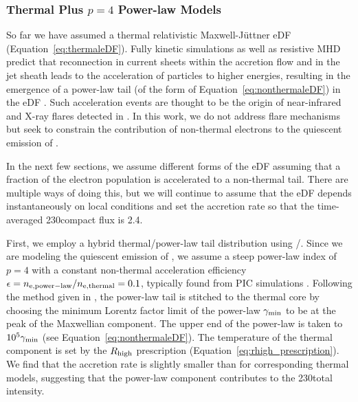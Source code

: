 \subsubsection{Thermal Plus \texorpdfstring{$p = 4$}{p=4} Power-law Models}

So far we have assumed a thermal relativistic Maxwell-J{\"u}ttner eDF (Equation~\ref{eq:thermaleDF}).
Fully kinetic simulations as well as resistive MHD predict that reconnection in current sheets within the accretion flow and in the jet sheath leads to the acceleration of particles to higher energies, resulting in the emergence of a power-law tail (of the form of Equation~\ref{eq:nonthermaleDF}) in the eDF \citep[e.g.,][and references therein]{Sironi2021}.
Such acceleration events are thought to be the origin of near-infrared and X-ray flares detected in \sgra.
In this work, we do not address flare mechanisms but seek to constrain the contribution of non-thermal electrons to the quiescent emission of \sgra.

In the next few sections, we assume different forms of the eDF assuming that a fraction of the electron population is accelerated to a non-thermal tail.
There are multiple ways of doing this, but we will continue to assume that the eDF depends instantaneously on local conditions and set the accretion rate so that the time-averaged 230\GHz compact flux is 2.4\Jy.

First, we employ a hybrid thermal/power-law tail distribution using \hamr/\bhoss.
Since we are modeling the quiescent emission of \sgra, we assume a steep power-law index of $p=4$ with a constant non-thermal acceleration efficiency $\epsilon=n_{\rm e, power-law}/n_{\rm e, thermal}=0.1$, typically found from PIC simulations \citep[e.g.,][]{Sironi2015,Crumley2019}.
Following the method given in \citet{Chatterjee2021}, the power-law tail is stitched to the thermal core by choosing the minimum Lorentz factor limit of the power-law $\gamma_{\rm min}$ to be at the peak of the Maxwellian component.
The upper end of the power-law is taken to $10^5 \gamma_{\rm min}$ (see Equation~\ref{eq:nonthermaleDF}).
The temperature of the thermal component is set by the $R_\mathrm{high}$ prescription (Equation~\ref{eq:rhigh_prescription}).
We find that the accretion rate is slightly smaller than for corresponding thermal models, suggesting that the power-law component contributes to the 230\GHz total intensity.


